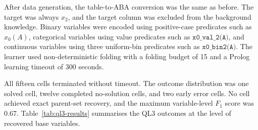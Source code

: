 After data generation, the table-to-ABA conversion was the same as before. The target was always \(x_2\), and the target column was excluded from the background knowledge. Binary variables were encoded using positive-case predicates such as \(x_0(A)\), categorical variables using value predicates such as \(\texttt{x0\_val\_2(A)}\), and continuous variables using three uniform-bin predicates such as \(\texttt{x0\_bin2(A)}\). The learner used non-deterministic folding with a folding budget of 15 and a Prolog learning timeout of 300 seconds.

All fifteen cells terminated without timeout. The outcome distribution was one solved cell, twelve completed no-solution cells, and two early error cells. No cell achieved exact parent-set recovery, and the maximum variable-level \(F_1\) score was \(0.67\). Table~\ref{tab:ql3-results} summarises the QL3 outcomes at the level of recovered base variables.

